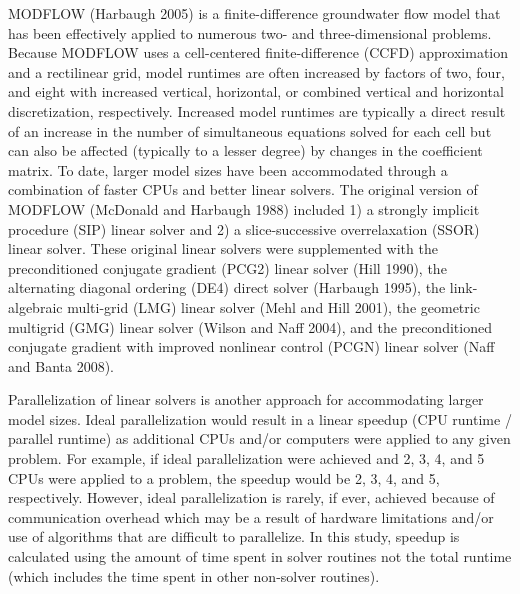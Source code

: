 \documentclass[12pt]{article}
\begin{document}
MODFLOW (Harbaugh 2005) is a finite-difference groundwater flow model that has been effectively applied to \color{blue}numerous \color{black}two- and three-dimensional problems. Because MODFLOW uses a cell-centered finite-difference (CCFD) approximation and a rectilinear grid, model runtimes are often increased by factors of two, four, and eight with increased vertical, horizontal, or combined vertical and horizontal discretization, respectively. \color{blue}Increased model runtimes are typically a direct result of an increase in the number of simultaneous equations solved for each cell but can also be affected (typically to a lesser degree) by changes in the coefficient matrix. \color{black}To date, larger model sizes have been accommodated through a combination of faster CPUs and better linear solvers. The original version of MODFLOW (McDonald and Harbaugh 1988) included 1) a strongly implicit procedure (SIP) linear solver and 2) a slice-successive overrelaxation (\color{cyan}SSOR\color{black}) linear solver. These original linear solvers were supplemented with the preconditioned conjugate gradient (PCG2) linear solver (Hill 1990), \color{cyan}the alternating diagonal ordering (DE4) direct solver (Harbaugh 1995), \color{black}the link-algebraic multi-grid (LMG) linear solver (Mehl and Hill 2001), the geometric multigrid (GMG) linear solver (Wilson and Naff 2004), and the  preconditioned conjugate gradient with improved nonlinear control (PCGN) linear solver (Naff and Banta 2008).

Parallelization of linear solvers is another approach for accommodating larger model sizes. \color{blue}Ideal parallelization would result in a linear speedup  (CPU runtime / parallel runtime) as additional CPUs and/or computers were applied to any given problem. For example, if ideal parallelization were achieved and 2, 3, 4, and 5 CPUs were applied to a problem, the speedup would be 2, 3, 4, and 5, respectively. However, ideal parallelization is rarely, if ever, achieved because of communication overhead which may be a result of hardware limitations and/or use of algorithms that are difficult to parallelize. \color{cyan}In this study, speedup is calculated using the amount of time spent in solver routines not the total runtime (which includes the time spent in other non-solver routines).\color{black}
\end{document}
